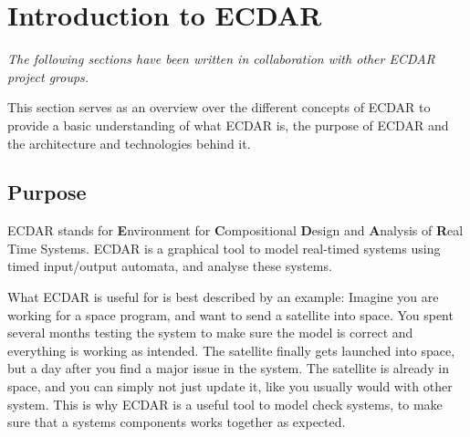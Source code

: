 \section{Introduction to ECDAR}\label{sec:introduction-to-ecdar}
\textit{The following sections have been written in collaboration with other ECDAR
project groups.}

This section serves as an overview over the different concepts of ECDAR to provide a basic understanding of what ECDAR is, the purpose of ECDAR and the architecture and technologies behind it.


\subsection{Purpose}\label{sub:purpose}
ECDAR stands for \textbf{E}nvironment for \textbf{C}ompositional \textbf{D}esign and \textbf{A}nalysis of \textbf{R}eal Time Systems.
ECDAR is a graphical tool to model real-timed systems using timed input/output automata, and analyse these systems. 

What ECDAR is useful for is best described by an example:
Imagine you are working for a space program, and want to send a satellite into space.
You spent several months testing the system to make sure the model is correct and everything is working as intended.
The satellite finally gets launched into space, but a day after you find a major issue in the system.
The satellite is already in space, and you can simply not just update it, like you usually would with other system. \label{ECDAR:satellite}
This is why ECDAR is a useful tool to model check systems, to make sure that a systems components works together as expected.


